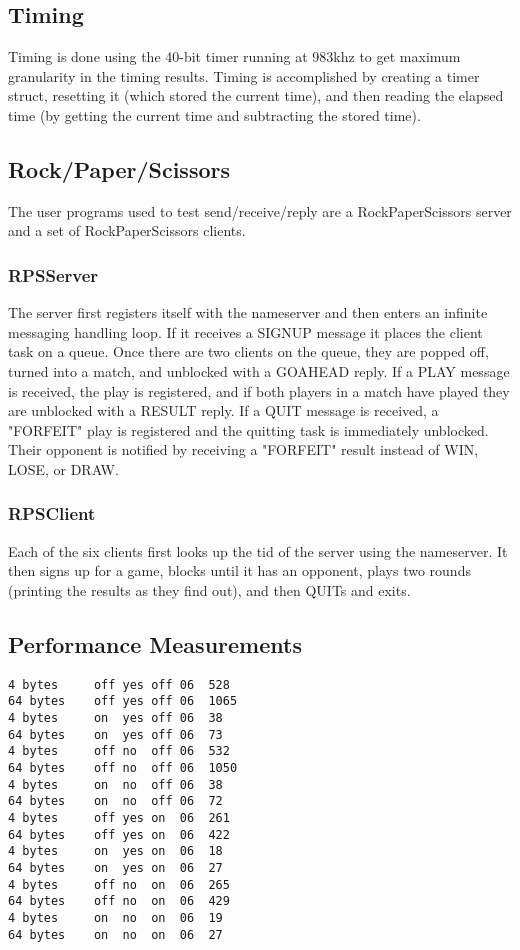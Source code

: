 \documentclass{article}
\begin{document}
\subsection{Timing}

Timing is done using the 40-bit timer running at 983khz to get maximum granularity in the timing results. Timing is accomplished by creating a timer struct, resetting it (which stored the current time), and then reading the elapsed time (by getting the current time and subtracting the stored time).

\subsection{Rock/Paper/Scissors}
The user programs used to test send/receive/reply are a RockPaperScissors server and a set of RockPaperScissors clients. 

\subsubsection{RPSServer}
The server first registers itself with the nameserver and then enters an infinite messaging handling loop.
If it receives a SIGNUP message it places the client task on a queue. Once there are two clients on the queue, they are popped off, turned into a match, and unblocked with a GOAHEAD reply.
If a PLAY message is received, the play is registered, and if both players in a match have played they are unblocked with a RESULT reply.
If a QUIT message is received, a "FORFEIT" play is registered and the quitting task is immediately unblocked. Their opponent is notified by receiving a "FORFEIT" result instead of WIN, LOSE, or DRAW.

\subsubsection{RPSClient}
Each of the six clients first looks up the tid of the server using the nameserver. It then signs up for a game, blocks until it has an opponent, plays two rounds (printing the results as they find out), and then QUITs and exits.

\subsection{Performance Measurements}
\begin{verbatim}
4 bytes		off	yes	off	06	528
64 bytes	off	yes	off	06	1065
4 bytes		on	yes	off	06	38
64 bytes	on	yes	off	06	73
4 bytes		off	no	off	06	532
64 bytes	off	no	off	06	1050
4 bytes		on	no	off	06	38
64 bytes	on	no	off	06	72
4 bytes		off	yes	on	06	261
64 bytes	off	yes	on	06	422
4 bytes		on	yes	on	06	18
64 bytes	on	yes	on	06	27
4 bytes		off	no	on	06	265
64 bytes	off	no	on	06	429
4 bytes		on	no	on	06	19
64 bytes	on	no	on	06	27
\end{verbatim}
\end{document}
